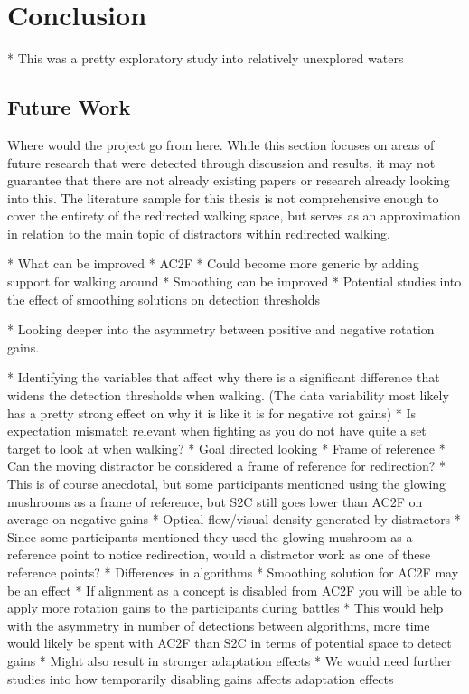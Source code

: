 \chapter{Conclusion}\label{chap:conclusion}

* This was a pretty exploratory study into relatively unexplored waters

\section{Future Work}\label{sec:futurework}
Where would the project go from here. While this section focuses on areas of future research that were detected through discussion and results, it may not guarantee that there are not already existing papers or research already looking into this. The literature sample for this thesis is not comprehensive enough to cover the entirety of the redirected walking space, but serves as an approximation in relation to the main topic of distractors within redirected walking. 

* What can be improved
* AC2F
   * Could become more generic by adding support for walking around
   * Smoothing can be improved
   * Potential studies into the effect of smoothing solutions on detection thresholds

* Looking deeper into the asymmetry between positive and negative rotation gains. 

* Identifying the variables that affect why there is a significant difference that widens the detection thresholds when walking. (The data variability most likely has a pretty strong effect on why it is like it is for negative rot gains)
   * Is expectation mismatch relevant when fighting as you do not have quite a set target to look at when walking?
      * Goal directed looking
   * Frame of reference
      * Can the moving distractor be considered a frame of reference for redirection?
      * This is of course anecdotal, but some participants mentioned using the glowing mushrooms as a frame of reference, but S2C still goes lower than AC2F on average on negative gains
      * Optical flow/visual density generated by distractors
         * Since some participants mentioned they used the glowing mushroom as a reference point to notice redirection, would a distractor work as one of these reference points?
   * Differences in algorithms
      * Smoothing solution for AC2F may be an effect
      * If alignment as a concept is disabled from AC2F you will be able to apply more rotation gains to the participants during battles
         * This would help with the asymmetry in number of detections between algorithms, more time would likely be spent with AC2F than S2C in terms of potential space to detect gains
         * Might also result in stronger adaptation effects
            * We would need further studies into how temporarily disabling gains affects adaptation effects

